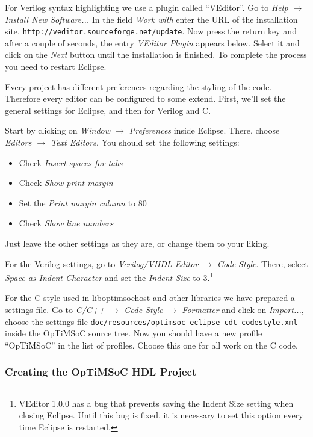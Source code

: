 For Verilog syntax highlighting we use a plugin called ``VEditor''. Go to
\emph{Help $\rightarrow$ Install New Software...} In the field \emph{Work with}
enter the URL of the installation site,
\verb|http://veditor.sourceforge.net/update|. Now press the return key and after
a couple of seconds, the entry \emph{VEditor Plugin} appears below. Select it
and click on the \emph{Next} button until the installation is finished. To
complete the process you need to restart Eclipse.

Every project has different preferences regarding the styling of the code.
Therefore every editor can be configured to some extend. First, we'll set the
general settings for Eclipse, and then for Verilog and C.

Start by clicking on \emph{Window $\rightarrow$ Preferences} inside Eclipse.
There, choose \emph{Editors $\rightarrow$ Text Editors}. You should set the
following settings:

\begin{itemize}
 \item Check \emph{Insert spaces for tabs}
 \item Check \emph{Show print margin}
 \item Set the \emph{Print margin column} to 80
 \item Check \emph{Show line numbers}
\end{itemize}

Just leave the other settings as they are, or change them to your liking.

For the Verilog settings, go to \emph{Verilog/VHDL Editor $\rightarrow$ Code
Style}. There, select \emph{Space as Indent Character} and set the \emph{Indent
Size} to 3.\footnote{VEditor 1.0.0 has a bug that prevents saving the Indent
Size setting when closing Eclipse. Until this bug is fixed, it is necessary to
set this option every time Eclipse is restarted.}

For the C style used in liboptimsochost and other libraries we have prepared a
settings file. Go to \emph{C/C++ $\rightarrow$ Code Style $\rightarrow$
Formatter} and click on \emph{Import...}, choose the settings file
\verb|doc/resources/optimsoc-eclipse-cdt-codestyle.xml| inside the OpTiMSoC
source tree. Now you should have a new profile ``OpTiMSoC'' in the list of
profiles. Choose this one for all work on the C code.

\subsubsection{Creating the OpTiMSoC HDL Project}

